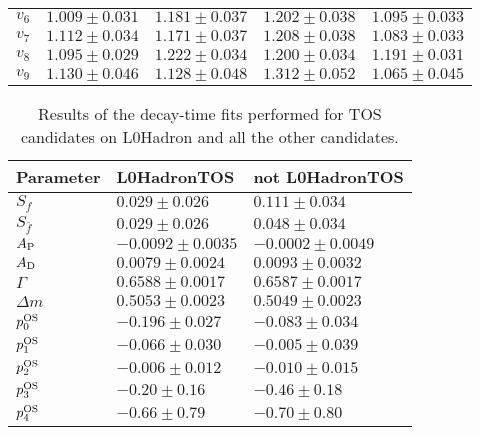 \begin{table}
\begin{tabular}{lllll}
      $v_{6}$               &   $1.009\pm0.031$       & $1.181\pm0.037$       & $1.202\pm0.038$       & $1.095\pm0.033$        \\ 
      $v_{7}$               &   $1.112\pm0.034$       & $1.171\pm0.037$       & $1.208\pm0.038$       & $1.083\pm0.033$        \\ 
      $v_{8}$               &   $1.095\pm0.029$       & $1.222\pm0.034$       & $1.200\pm0.034$       & $1.191\pm0.031$        \\ 
      $v_{9}$               &   $1.130\pm0.046$       & $1.128\pm0.048$       & $1.312\pm0.052$       & $1.065\pm0.045$        \\ 
      \bottomrule
    \end{tabular}
\end{table}

\begin{table}
  \centering
  \caption{Results of the decay-time fits performed for TOS candidates on L0Hadron and all the other candidates.}
  \label{tab:timesplitsL0Hadron}
    \begin{tabular}{lll}
      \toprule
      Parameter & L0HadronTOS & not L0HadronTOS \\
      \midrule
      $S_{f}$               &  $0.029\pm0.026$      & $0.111\pm0.034$ \\      
      $S_{\bar f}$          &  $0.029\pm0.026$      & $0.048\pm0.034$ \\ 
      \midrule
      $A_{\rm P}$               &  $-0.0092\pm0.0035$    & $-0.0002\pm0.0049$ \\ 
      $A_{\rm D}$               &  $0.0079\pm0.0024$     & $0.0093\pm0.0032$ \\    
      \midrule
      $\Gamma$              &  $0.6588\pm0.0017$     & $0.6587\pm0.0017$ \\              
      $\Delta m$            &  $0.5053\pm0.0023$     & $0.5049\pm0.0023$ \\ 
      \midrule
      $p_{0}^{\rm OS}$             &  $-0.196\pm0.027$      & $-0.083\pm0.034$ \\  
      $p_{1}^{\rm OS}$             &  $-0.066\pm0.030$      & $-0.005\pm0.039$ \\      
      $p_{2}^{\rm OS}$             &  $-0.006\pm0.012$      & $-0.010\pm0.015$ \\      
      $p_{3}^{\rm OS}$             &  $-0.20\pm0.16$        & $-0.46\pm0.18$ \\        
      $p_{4}^{\rm OS}$             &  $-0.66\pm0.79$        & $-0.70\pm0.80$ \\    

\end{tabular}
\end{table}
